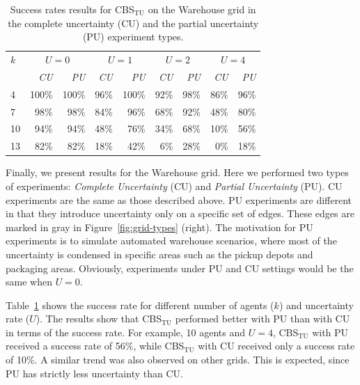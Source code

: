\documentclass[jair,twoside,11pt,theapa]{article}
\newcommand{\cbstu}{CBS$\mathrm{_{TU}}$\xspace}
\begin{document}
\begin{table}
\centering
{
\begin{tabular}{l*{8}{r}}
\toprule
$k$ & \multicolumn{2}{c}{$U = 0$} & \multicolumn{2}{c}{$U = 1$} & \multicolumn{2}{c}{$U = 2$} & \multicolumn{2}{c}{$U = 4$} \\
\cmidrule(lr){2-3}\cmidrule(lr){4-5}\cmidrule(lr){6-7}\cmidrule(lr){8-9}
  & \emph{CU} & \emph{PU} & \emph{CU} & \emph{PU} & \emph{CU} & \emph{PU} & \emph{CU} & \emph{PU} \\ \midrule
4   & 100\%	&100\%	&96\%	&100\%	&92\%	&98\%	&86\%	&96\%
\\
7   &98\%	&98\%	&84\%	&96\%	&68\%	&92\%	&48\%	&80\%
   \\
10  &94\%	&94\%	&48\%	&76\%	&34\%	&68\%	&10\%	&56\%
\\
13  &82\%	&82\%	&18\%	&42\%	&6\%	&28\%	&0\%	&18\%
\\
\bottomrule
\end{tabular}}
\caption{Success rates results for \cbstu on the Warehouse grid in the complete uncertainty (CU) 
and the partial uncertainty (PU) experiment types.
}
\label{tab:success-rate-3}
\end{table}

Finally, we present results for the Warehouse grid. 
Here we performed two types of experiments: 
\emph{Complete Uncertainty} (CU) and \emph{Partial Uncertainty} (PU).
CU experiments are the same as those described above.
PU experiments are different in that they introduce uncertainty only on a specific set of edges. 
These edges are marked in gray in Figure~\ref{fig:grid-types} (right). 
The motivation for PU experiments is to simulate automated warehouse scenarios, where most of the  uncertainty is condensed in specific areas such as the pickup depots and packaging areas. 
Obviously, experiments under PU and CU settings would be the same when $U=0$. 

Table~\ref{tab:success-rate-3} shows the success rate for different number of agents ($k$) and uncertainty rate ($U$). 
The results show that \cbstu performed better with PU than with CU in terms of the success rate. 
For example, 10 agents and $U=4$, \cbstu with PU received a success rate of 56\%, while \cbstu with CU received only a success rate of 10\%.  A similar trend was also observed on other grids. This is expected, since PU has strictly less uncertainty than CU. 
\end{document}
